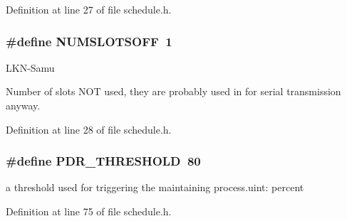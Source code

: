 Definition at line 27 of file schedule.\+h.

\subsubsection[{\texorpdfstring{N\+U\+M\+S\+L\+O\+T\+S\+O\+FF}{NUMSLOTSOFF}}]{\setlength{\rightskip}{0pt plus 5cm}\#define N\+U\+M\+S\+L\+O\+T\+S\+O\+FF~1}\hypertarget{group___schedule_ga9fd457940c2d1313fb347b5fd32d2105}{}\label{group___schedule_ga9fd457940c2d1313fb347b5fd32d2105}
\begin{DoxyRefDesc}{L\+K\+N-\/\+Samu}
\item[\hyperlink{_l_k_n_code_edits__LKN_code_edits000024}{L\+K\+N-\/\+Samu}]Number of slots N\+OT used, they are probably used in for serial transmission anyway. \end{DoxyRefDesc}


Definition at line 28 of file schedule.\+h.

\subsubsection[{\texorpdfstring{P\+D\+R\+\_\+\+T\+H\+R\+E\+S\+H\+O\+LD}{PDR_THRESHOLD}}]{\setlength{\rightskip}{0pt plus 5cm}\#define P\+D\+R\+\_\+\+T\+H\+R\+E\+S\+H\+O\+LD~80}\hypertarget{group___schedule_ga120d77f8a5101329b471874495b73942}{}\label{group___schedule_ga120d77f8a5101329b471874495b73942}


a threshold used for triggering the maintaining process.\+uint\+: percent 



Definition at line 75 of file schedule.\+h.

